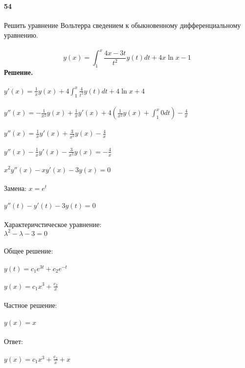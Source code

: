 \documentclass[10pt,a4paper]{article}
\begin{document}
	\noindent\textbf{54} \\ \\
	Решить уравнение Вольтерра сведением к обыкновенному дифференциальному уравнению.\\ \\
	$$y(x) = \int_{1}^{x}\frac{4x-3t}{t^2}y(t)dt + 4x\ln{x} - 1$$ 
	\textbf{Решение.} \\ \\
	$y'(x)=\frac{1}{x}y(x)+4\int_{1}^{x}\frac{4}{t^2}y(t)dt + 4\ln{x} + 4$ \\ \\
	$y''(x)=-\frac{1}{x^2}y(x)+\frac{1}{x}y'(x)+4(\frac{1}{x^2}y(x)+\int_{1}^{x}0dt)-\frac{4}{x}$ \\ \\
	$y''(x)=\frac{1}{x}y'(x)+\frac{3}{x^2}y(x)-\frac{4}{x}$ \\ \\
	$y''(x)-\frac{1}{x}y'(x)-\frac{3}{x^2}y(x)=-\frac{4}{x}$ \\ \\
	$x^2y''(x)-xy'(x)-3y(x)=0$ \\ \\
	Замена: $x=e^t$ \\ \\
	$y''(t)-y'(t)-3y(t)=0$ \\ \\
	Характеричстическое уравнение:\\
	$\lambda^2-\lambda-3=0$ \\ \\
	Общее решение: \\ \\
	$y(t)=c_1e^{3t}+c_2e^{-t}$ \\ \\
	$y(x)=c_1x^3+\frac{c_2}{x}$ \\ \\
	Частное решение: \\ \\
	$y(x)=x$ \\ \\
	Ответ:\\ \\
	$y(x)=c_1x^3+\frac{c_2}{x}+x$ \\ \\
\end{document}
